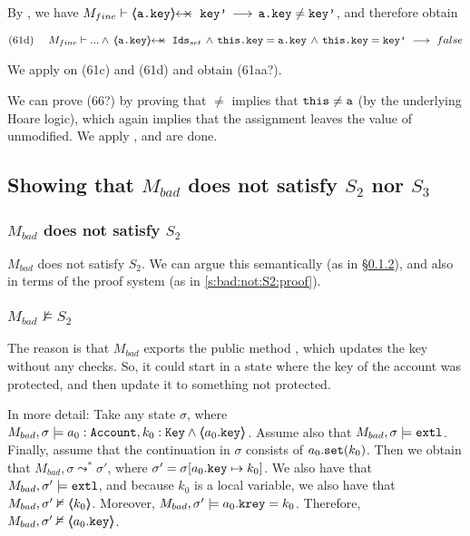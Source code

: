 \begin{proofO}
By  {}, we have $M_{fine} \vdash  \protectedFrom {\prg{a.key}} {\prg{key'}} \, \longrightarrow\, {\prg{a.key}}\neq {\prg{key'}}$, and therefore obtain

\begin{align*}
\text{(61d)}  \ \ \ \ M_{fine} \vdash  ... \wedge \, \protectedFrom {\prg{a.key}} {\Idsset} \, \wedge  \, \prg{this.key}=\prg{a.key}\, \wedge\,  \prg{this.key}=\prg{key'}\ \longrightarrow \ false 
\end{align*}

We apply  {} on (61c) and (61d) and obtain (61aa?).

\vspace{.5cm}
We can prove (66?) by proving that $\neq$ implies that $\mbox{\normalfont{\texttt{this}}}\neq \mbox{\normalfont{\texttt{a}}}$ (by the underlying Hoare logic), which again implies that the assignment  leaves the value of  unmodified. We apply {}, and are done.

\end{proofO} 



\subsection{Showing that $M_{bad}$ does not satisfy $S_2$ nor $S_3$}

\subsubsection{$M_{bad}$ does not satisfy $S_2$}
$M_{bad}$ does not satisfy $S_2$. We can argue this semantically (as in \S \ref{s:bad:not:S2}), and also in terms of the proof system (as in \ref{s:bad:not:S2:proof}).


\subsubsection{$M_{bad}\nvDash S_2$}
\label{s:bad:not:S2}
 The reason is that $M_{bad}$ exports the public method , which updates the key without any checks. 
So, it could start in a state where the key of the account was protected, and then update it to something not protected.


In more detail: Take any state $\sigma$, where $M_{bad},\sigma \models a_0:\mbox{\normalfont{\texttt{Account}}}, k_0:\mbox{\normalfont{\texttt{Key}}} \wedge \langle\!\!\langle a_0.\mbox{\normalfont{\texttt{key}}} \rangle\!\!\rangle$. 
Assume also that $M_{bad},\sigma \models \mbox{\normalfont{\texttt{extl}}}$.  
Finally, assume that the continuation in $\sigma$ consists of $a_0.\mbox{\normalfont{\texttt{set}}}(k_0)$.
Then we obtain that $M_{bad}, \sigma \leadsto^* \sigma'$, where $\sigma'=\sigma[a_0.\mbox{\normalfont{\texttt{key}}}\mapsto k_0]$.
We also  have that $M_{bad},\sigma' \models \mbox{\normalfont{\texttt{extl}}}$, and because $k_0$ is a local variable, we also have that $M_{bad},\sigma' \nvDash \langle\!\!\langle k_0 \rangle\!\!\rangle$.
Moreover, $M_{bad}, \sigma' \models a_0.\mbox{\normalfont{\texttt{krey}}}=k_0 $.
Therefore, $M_{bad},\sigma' \nvDash \langle\!\!\langle a_0.\mbox{\normalfont{\texttt{key}}} \rangle\!\!\rangle$.

